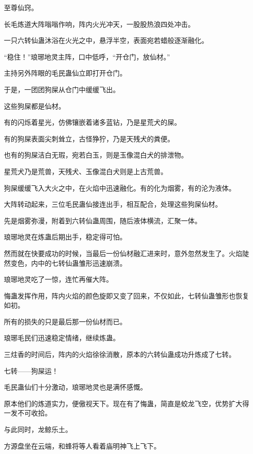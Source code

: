 
\begin{this_body}

至尊仙窍。

长毛炼道大阵嗡嗡作响，阵内火光冲天，一股股热浪四处冲击。

一只六转仙蛊沐浴在火光之中，悬浮半空，表面宛若蜡般逐渐融化。

“稳住！”琅琊地灵主阵，口中低呼，“开仓门，放仙材。”

主持另外阵眼的毛民蛊仙立即打开仓门。

于是，一团团狗屎从仓门中缓缓飞出。

这些狗屎都是仙材。

有的闪烁着星光，仿佛镶嵌着诸多蓝钻，乃是星荒犬的屎。

有的狗屎表面尖刺耸立，古怪狰狞，乃是天残犬的粪便。

也有的狗屎洁白无瑕，宛若白玉，则是玉像混白犬的排泄物。

星荒犬乃是荒兽，天残犬、玉像混白犬则是上古荒兽。

狗屎缓缓飞入大火之中，在火焰中迅速融化。有的化为烟雾，有的沦为液体。

大阵转动起来，三位毛民蛊仙接连出手，相互配合，处理这些狗屎仙材。

先是烟雾弥漫，附着到六转仙蛊周围，随后液体横流，汇聚一体。

琅琊地灵在炼蛊后期出手，稳定得可怕。

然而就在快要成功的时候，当最后一份仙材融汇进来时，意外忽然发生了。火焰陡然变色，内中的七转仙蛊雏形迅速崩溃。

琅琊地灵吃了一惊，连忙再催大阵。

悔蛊发挥作用，阵内火焰的颜色旋即又变了回来，不仅如此，七转仙蛊雏形也恢复如初。

所有的损失的只是最后那一份仙材而已。

琅琊毛民们迅速稳定情绪，继续炼蛊。

三炷香的时间后，阵内的火焰徐徐消散，原本的六转仙蛊成功升炼成了七转。

七转——狗屎运！

毛民蛊仙们十分激动，琅琊地灵也是满怀感慨。

原本他们的炼道实力，便傲视天下。现在有了悔蛊，简直是蛟龙飞空，优势扩大得一发不可收拾。

与此同时，龙鲸乐土。

方源盘坐在云端，和蜂将等人看着庙明神飞上飞下。


\end{this_body}
